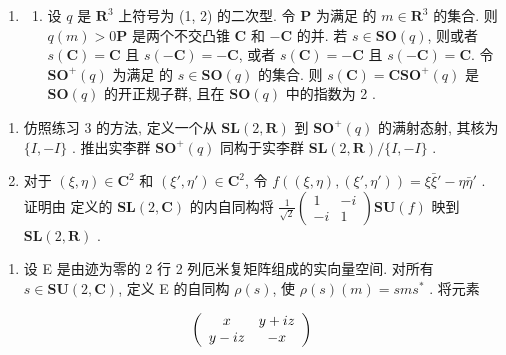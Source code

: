 \begin{enumerate}
\def\labelenumi{\arabic{enumi}.}
\setcounter{enumi}{3}
\tightlist
\item
  \begin{enumerate}
  \def\labelenumii{(\alph{enumii})}
  \tightlist
  \item
    设 \(q\) 是 \(\mathbf{R}^3\) 上符号为 (1, 2) 的二次型. 令 \(\mathbf{P}\) 为满足  的 \(m \in \mathbf{R}^3\) 的集合. 则 \(q(m) > 0\)\(\mathbf{P}\) 是两个不交凸锥 \(\mathbf{C}\) 和 \(-\mathbf{C}\) 的并. 若 \(s \in \mathbf{SO}(q)\), 则或者 \(s(\mathbf{C}) = \mathbf{C}\) 且 \(s(-\mathbf{C}) = -\mathbf{C}\), 或者 \(s(\mathbf{C}) = -\mathbf{C}\) 且 \(s(-\mathbf{C}) = \mathbf{C}\). 令 \(\mathbf{SO}^{+}(q)\) 为满足  的 \(s \in \mathbf{SO}(q)\) 的集合. 则 \(s(\mathbf{C}) = \mathbf{C}\)\(\mathbf{SO}^{+}(q)\) 是 \(\mathbf{SO}(q)\) 的开正规子群, 且在 \(\mathbf{SO}(q)\) 中的指数为 2 .
  \end{enumerate}
\end{enumerate}

\begin{enumerate}
\def\labelenumi{(\alph{enumi})}
\setcounter{enumi}{1}
\item
  仿照练习 3 的方法, 定义一个从 \(\mathbf{SL}(2,\mathbf{R})\) 到 \(\mathbf{SO}^{+}(q)\) 的满射态射, 其核为 \(\{I, - I\}\) . 推出实李群 \(\mathbf{SO}^{+}(q)\) 同构于实李群 \(\mathbf{SL}(2,\mathbf{R}) / \{I, - I\}\) .
\item
  对于 \((\xi, \eta) \in \mathbf{C}^2\) 和 \((\xi', \eta') \in \mathbf{C}^2\), 令 \(f((\xi, \eta), (\xi', \eta')) = \xi \bar{\xi}' - \eta \bar{\eta}'\) . 证明由  定义的 \(\mathbf{SL}(2, \mathbf{C})\) 的内自同构将 \(\frac{1}{\sqrt{2}} \begin{pmatrix} 1 & -i \\ -i & 1 \end{pmatrix}\)\(\mathbf{SU}(f)\) 映到 \(\mathbf{SL}(2, \mathbf{R})\) .
\end{enumerate}

\begin{enumerate}
\def\labelenumi{\arabic{enumi}.}
\setcounter{enumi}{4}
\tightlist
\item
  设 E 是由迹为零的 2 行 2 列厄米复矩阵组成的实向量空间. 对所有 \(s \in \mathbf{SU}(2, \mathbf{C})\), 定义 E 的自同构 \(\rho(s)\), 使 \(\rho(s)(m) = sms^*\) . 将元素
\end{enumerate}

\[
\left( \begin{array}{c c} x & y + i z \\ y - i z & - x \end{array} \right)
\]

